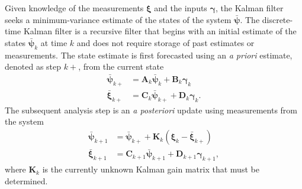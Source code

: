 Given knowledge of the measurements $\boldsymbol{\xi}$ and the inputs $\boldsymbol{\gamma}$, the Kalman filter seeks a minimum-variance estimate of the states of the system $\bar{\boldsymbol{\psi}}$. The discrete-time Kalman filter is a recursive filter that begins with an initial estimate of the states $\bar{\boldsymbol{\psi}}_k$ at time $k$ and does not require storage of past estimates or measurements. The state estimate is first forecasted using an \textit{a priori} estimate, denoted as step $k+$, from the current state
\begin{align}
\label{eq:linear_forecast1}
\bar{\boldsymbol{\psi}}_{k+} &= \mathbf{A}_k \bar{\boldsymbol{\psi}}_k + \mathbf{B}_k \boldsymbol{\gamma}_k \\
\label{eq:linear_forecast2}
\bar{\boldsymbol{\xi}}_{k+} &= \mathbf{C}_k\bar{\boldsymbol{\psi}}_{k+} + \mathbf{D}_k\boldsymbol{\gamma}_k.
\end{align}
The subsequent analysis step is an \textit{a posteriori} update using measurements from the system 
\begin{align}
\label{eq:linear_analysis1}
\bar{\boldsymbol{\psi}}_{k+1} &= \bar{\boldsymbol{\psi}}_{k+} + \mathbf{K}_k(\boldsymbol{\xi}_k - \bar{\boldsymbol{\xi}}_{k+}) \\
\label{eq:linear_analysis2}
\bar{\boldsymbol{\xi}}_{k+1} &= \mathbf{C}_{k+1}\bar{\boldsymbol{\psi}}_{k+1} + \mathbf{D}_{k+1}\boldsymbol{\gamma}_{k+1},
\end{align}
where $\mathbf{K}_k$ is the currently unknown Kalman gain matrix that must be determined.

